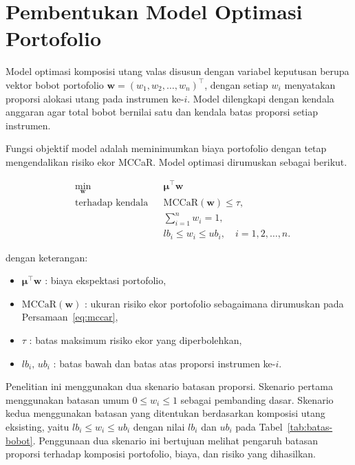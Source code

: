 \section{Pembentukan Model Optimasi Portofolio}\label{sec:pembentukan-model}
Model optimasi komposisi utang valas disusun dengan variabel keputusan berupa vektor bobot portofolio $\mathbf{w} = (w_1, w_2, \ldots, w_n)^{\top}$, dengan setiap $w_i$ menyatakan proporsi alokasi utang pada instrumen ke-$i$. Model dilengkapi dengan kendala anggaran agar total bobot bernilai satu dan kendala batas proporsi setiap instrumen.

Fungsi objektif model adalah meminimumkan biaya portofolio dengan tetap mengendalikan risiko ekor MCCaR. Model optimasi dirumuskan sebagai berikut.

\begin{equation}
    \label{eq:model-mccar}
    \begin{aligned}
    &\min_{\mathbf{w}}
    && \boldsymbol{\mu}^{\top}\mathbf{w} \\
    &\text{terhadap kendala}
    && \mathrm{MCCaR}(\mathbf{w}) \leq \tau, \\
    &&& \sum_{i=1}^{n} w_i = 1, \\
    &&& lb_i \leq w_i \leq ub_i, \quad i = 1, 2, \ldots, n.
    \end{aligned}
\end{equation}

dengan keterangan:
\begin{itemize}
    \item $\boldsymbol{\mu}^{\top}\mathbf{w}$ : biaya ekspektasi portofolio,
    \item $\mathrm{MCCaR}(\mathbf{w})$ : ukuran risiko ekor portofolio sebagaimana dirumuskan pada Persamaan~\ref{eq:mccar},
    \item $\tau$ : batas maksimum risiko ekor yang diperbolehkan,
    \item $lb_i,\,ub_i$ : batas bawah dan batas atas proporsi instrumen ke-$i$.
\end{itemize}

Penelitian ini menggunakan dua skenario batasan proporsi. Skenario pertama menggunakan batasan umum $0 \leq w_i \leq 1$ sebagai pembanding dasar. Skenario kedua menggunakan batasan yang ditentukan berdasarkan komposisi utang eksisting, yaitu $lb_i \leq w_i \leq ub_i$ dengan nilai $lb_i$ dan $ub_i$ pada Tabel~\ref{tab:batas-bobot}. Penggunaan dua skenario ini bertujuan melihat pengaruh batasan proporsi terhadap komposisi portofolio, biaya, dan risiko yang dihasilkan.

